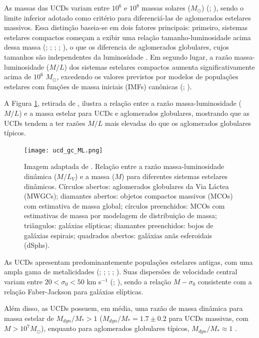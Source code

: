 As massas das UCDs variam entre $10^6$ e $10^8$ massas solares ($M_{\odot}$) (\citealp{Mieske_2008_1}; \citealp{Misgeld_2011_2}), sendo o limite inferior adotado como critério para diferenciá-las de aglomerados estelares massivos. Essa distinção baseia-se em dois fatores principais: primeiro, sistemas estelares compactos começam a exibir uma relação tamanho-luminosidade acima dessa massa (\citealp{Hasegan_2005}; \citealp{Cote_2006}; \citealp{Rejkuba_2007}; \citealp{Evstigneeva_2008}; \citealp{Norris_2011}), o que os diferencia de aglomerados globulares, cujos tamanhos são independentes da luminosidade \citep{Jornan_2005}. Em segundo lugar, a razão massa-luminosidade ($M/L$) dos sistemas estelares compactos aumenta significativamente acima de $10^6$ $M_{\odot}$, excedendo os valores previstos por modelos de populações estelares com funções de massa iniciais (IMFs) canônicas (\citealp{Hasegan_2005}; \citealp{Dabringhausen_2008}).

A Figura \ref{ucd_gc_ML}, retirada de \cite{Dabringhausen_2008}, ilustra a relação entre a razão massa-luminosidade ($M/L$) e a massa estelar para UCDs e aglomerados globulares, mostrando que as UCDs tendem a ter razões $M/L$ mais elevadas do que os aglomerados globulares típicos.

\begin{figure}[!ht]
    \centering
    \texttt{[image: ucd\_gc\_ML.png]}
    \caption[]{Imagem adaptada de \cite{Dabringhausen_2008}. Relação entre a razão massa-luminosidade dinâmica ($M/L_V$) e a massa ($M$) para diferentes sistemas estelares dinâmicos. Círculos abertos: aglomerados globulares da Via Láctea (MWGCs); diamantes abertos: objetos compactos massivos (MCOs) com estimativa de massa global; círculos preenchidos: MCOs com estimativas de massa por modelagem de distribuição de massa; triângulos: galáxias elípticas; diamantes preenchidos: bojos de galáxias espirais; quadrados abertos: galáxias anãs esferoidais (dSphs).}
    \label{ucd_gc_ML}
\end{figure}

As UCDs apresentam predominantemente populações estelares antigas, com uma ampla gama de metalicidades (\citealp{Evstigneeva_2009}; \citealp{Janz_2015}; \citealp{Zhang_2018}; \citealp{Forbes_2020}; \citealp{Fahrion_2020}). Suas dispersões de velocidade central variam entre $20 < \sigma_0 < 50$ km s$^{-1}$ (\citealp{Hasegan_2005}; \citealp{Mieske_2008_1}), sendo a relação $M-\sigma_0$ consistente com a relação Faber-Jackson para galáxias elípticas.

Além disso, as UCDs possuem, em média, uma razão de massa dinâmica para massa estelar de $M_{dyn}/M_* > 1$ ($M_{dyn}/M_* = 1.7 \pm 0.2$ para UCDs massivas, com $M > 10^7 M_{\odot}$), enquanto para aglomerados globulares típicos, $M_{dyn}/M_* \approx 1$ \citep{Mieske_2013}.

